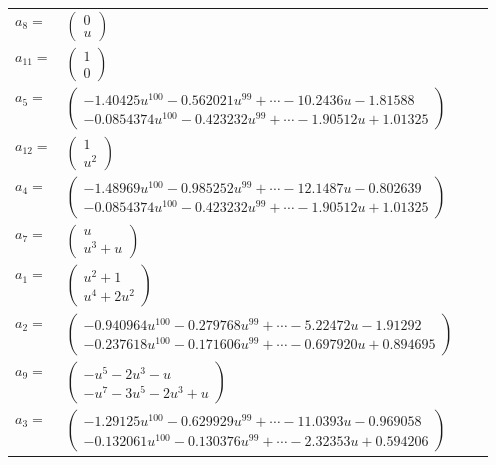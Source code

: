 \documentclass[1p]{elsarticle_modified}
\theoremstyle{definition}
\begin{document}
\begin{tabular}{m{7pt} m{180pt} m{7pt} m{180pt} }
\flushright $a_{8}=$&$\begin{pmatrix}0\\u\end{pmatrix}$ \\
\flushright $a_{11}=$&$\begin{pmatrix}1\\0\end{pmatrix}$ \\
\flushright $a_{5}=$&$\begin{pmatrix}-1.40425 u^{100}-0.562021 u^{99}+\cdots-10.2436 u-1.81588\\-0.0854374 u^{100}-0.423232 u^{99}+\cdots-1.90512 u+1.01325\end{pmatrix}$ \\
\flushright $a_{12}=$&$\begin{pmatrix}1\\u^2\end{pmatrix}$ \\
\flushright $a_{4}=$&$\begin{pmatrix}-1.48969 u^{100}-0.985252 u^{99}+\cdots-12.1487 u-0.802639\\-0.0854374 u^{100}-0.423232 u^{99}+\cdots-1.90512 u+1.01325\end{pmatrix}$ \\
\flushright $a_{7}=$&$\begin{pmatrix}u\\u^3+u\end{pmatrix}$ \\
\flushright $a_{1}=$&$\begin{pmatrix}u^2+1\\u^4+2 u^2\end{pmatrix}$ \\
\flushright $a_{2}=$&$\begin{pmatrix}-0.940964 u^{100}-0.279768 u^{99}+\cdots-5.22472 u-1.91292\\-0.237618 u^{100}-0.171606 u^{99}+\cdots-0.697920 u+0.894695\end{pmatrix}$ \\
\flushright $a_{9}=$&$\begin{pmatrix}- u^5-2 u^3- u\\- u^7-3 u^5-2 u^3+u\end{pmatrix}$ \\
\flushright $a_{3}=$&$\begin{pmatrix}-1.29125 u^{100}-0.629929 u^{99}+\cdots-11.0393 u-0.969058\\-0.132061 u^{100}-0.130376 u^{99}+\cdots-2.32353 u+0.594206\end{pmatrix}$ \\

\end{tabular}
\end{document}
